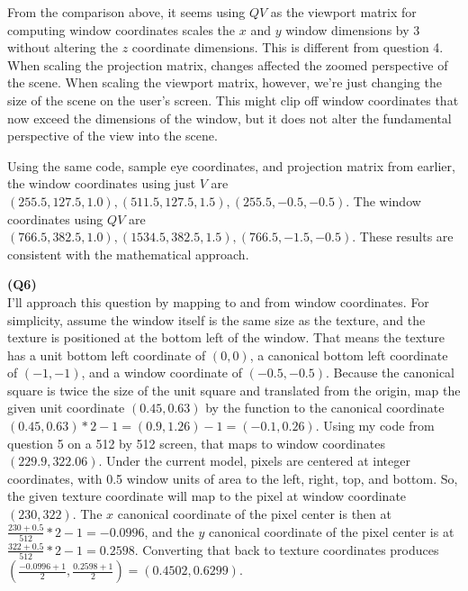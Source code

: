 \documentclass[letterpaper, 11pt]{article}
\begin{document}
From the comparison above, it seems using $QV$ as the viewport matrix for computing window coordinates scales the $x$ and $y$ window dimensions by $3$ without altering the $z$ coordinate dimensions. This is different from question 4. When scaling the projection matrix, changes affected the zoomed perspective of the scene. When scaling the viewport matrix, however, we're just changing the size of the scene on the user's screen. This might clip off window coordinates that now exceed the dimensions of the window, but it does not alter the fundamental perspective of the view into the scene. 

\medskip
Using the same code, sample eye coordinates, and projection matrix from earlier, the window coordinates using just $V$ are $(255.5, 127.5, 1.0), (511.5, 127.5, 1.5), (255.5, -0.5, -0.5)$. The window coordinates using $QV$ are $(766.5, 382.5, 1.0), (1534.5, 382.5, 1.5), (766.5, -1.5, -0.5)$. These results are consistent with the mathematical approach. 


\medskip
\textbf{(Q6)} \\ 
I'll approach this question by mapping to and from window coordinates. For simplicity, assume the window itself is the same size as the texture, and the texture is positioned at the bottom left of the window. That means the texture has a unit bottom left coordinate of $(0, 0)$, a canonical bottom left coordinate of $(-1, -1)$, and a window coordinate of $(-0.5, -0.5)$. Because the canonical square is twice the size of the unit square and translated from the origin, map the given unit coordinate $(0.45, 0.63)$ by the function to the canonical coordinate $(0.45, 0.63) * 2 - 1= (0.9, 1.26) - 1 = (-0.1, 0.26)$. Using my code from question 5 on a 512 by 512 screen, that maps to window coordinates $(229.9, 322.06)$. Under the current model, pixels are centered at integer coordinates, with 0.5 window units of area to the left, right, top, and bottom. So, the given texture coordinate will map to the pixel at window coordinate $(230, 322)$. The $x$ canonical coordinate of the pixel center is then at $\frac{230 + 0.5}{512} * 2 - 1 = -0.0996$, and the $y$ canonical coordinate of the pixel center is at $\frac{322 + 0.5}{512} * 2 - 1 = 0.2598$. Converting that back to texture coordinates produces $(\frac{-0.0996 + 1}{2}, \frac{0.2598 + 1}{2}) = (0.4502, 0.6299)$. 
\end{document}
